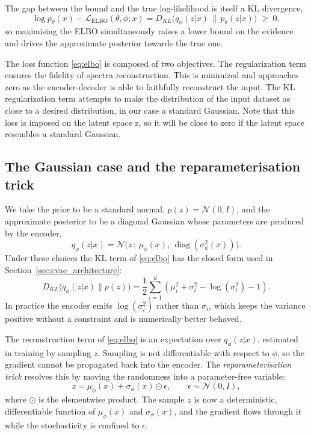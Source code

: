 The gap between the bound and the true log-likelihood is itself a KL divergence,
\begin{equation}
\log p_\theta(x) - \mathcal{L}_{\text{ELBO}}(\theta,\phi;x)
 = D_{KL}\big(q_\phi(z|x) \,\|\, p_\theta(z|x)\big) \;\ge\; 0 ,
\label{eq:elbo_gap}
\end{equation}
so maximising the ELBO simultaneously raises a lower bound on the evidence and drives the
approximate posterior towards the true one.

The loss function \eqref{eq:elbo} is composed of two objectives. The regularization term ensures the fidelity of spectra reconstruction. This is minimized and approaches zero as the encoder-decoder is able to faithfully reconstruct the input. The KL regularization term attempts to make the distribution of the input dataset as close to a desired distribution, in our case a standard Gaussian. Note that this loss is imposed on the latent space z, so it will be close to zero if the latent space resembles a standard Gaussian.

\subsection*{The Gaussian case and the reparameterisation trick}

We take the prior to be a standard normal, $p(z) = \mathcal{N}(0, I)$, and the approximate
posterior to be a diagonal Gaussian whose parameters are produced by the encoder,
\begin{equation}
q_\phi(z|x) = \mathcal{N}\big(z \,;\, \mu_\phi(x), \, \operatorname{diag}(\sigma^2_\phi(x))\big).
\label{eq:gaussian_posterior}
\end{equation}
Under these choices the KL term of \eqref{eq:elbo} has the closed form used in
Section~\ref{sec:cvae_architecture}:
\begin{equation}
D_{KL}\big(q_\phi(z|x) \| p(z)\big)
 = \frac{1}{2} \sum_{i=1}^{d} \left( \mu_i^2 + \sigma_i^2 - \log(\sigma_i^2) - 1 \right).
\label{eq:kl_gaussian}
\end{equation}
In practice the encoder emits $\log(\sigma_i^2)$ rather than $\sigma_i$, which keeps the
variance positive without a constraint and is numerically better behaved.

The reconstruction term of \eqref{eq:elbo} is an expectation over $q_\phi(z|x)$, estimated in
training by sampling $z$. Sampling is not differentiable with respect to $\phi$, so the
gradient cannot be propagated back into the encoder. The \emph{reparameterisation trick}
\cite{kingma2014vae} resolves this by moving the randomness into a parameter-free variable:
\begin{equation}
z = \mu_\phi(x) + \sigma_\phi(x) \odot \epsilon,
\qquad \epsilon \sim \mathcal{N}(0, I),
\label{eq:reparameterisation}
\end{equation}
where $\odot$ is the elementwise product. The sample $z$ is now a deterministic, differentiable
function of $\mu_\phi(x)$ and $\sigma_\phi(x)$, and the gradient flows through it while the
stochasticity is confined to $\epsilon$.

